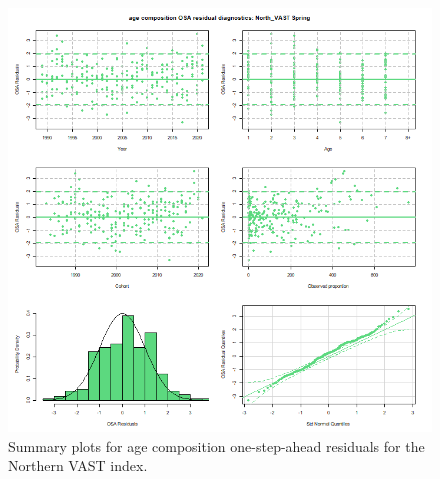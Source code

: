 \documentclass[
]{article}
\begin{document}
\begin{figure}

{\centering \includegraphics[width=1\linewidth]{../2023.RT.Runs/Run34/plots_png/diagnostics/OSA_resid_paa_6panel_North_VAST_Spring} 

}

\caption{Summary plots for age composition one-step-ahead residuals for the Northern VAST index.}\label{fig:osa-North-vast-paa-summ}
\end{figure}
\end{document}
